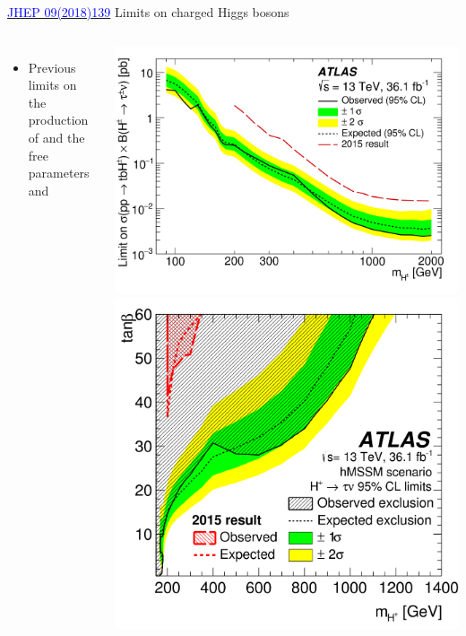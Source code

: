 \documentclass[aspectratio=169,xcolor=table]{beamer}
\begin{document}
    \begin{frame}{\href{https://link.springer.com/article/10.1007/JHEP09(2018)139}{\textcolor{blue}{JHEP 09(2018)139}} Limits on charged Higgs bosons}
      \begin{columns}
        \centering
        \begin{itemize}
          \item Previous limits on the production of \HpmLong and the free parameters \tanb and \mHpm
        \end{itemize}
        \includegraphics[width=\textwidth,keepaspectratio=true]{Limits/Combined_CrossSection_2018.png}
        \centering
        \includegraphics[width=\textwidth,keepaspectratio=true]{Limits/tanB_Limit_2018.png}
      \end{columns}
    \end{frame}
\end{document}
